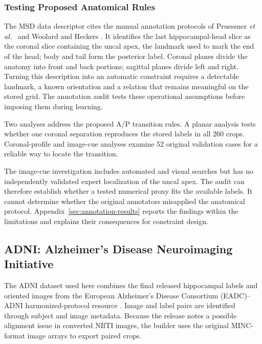 \subsubsection{Testing Proposed Anatomical Rules}
\label{sec:annotation-compatibility}

The MSD data descriptor \cite{simpson2019dataset} cites the manual
annotation protocols of Pruessner \emph{et al.}\
\cite{pruessner2000volumetry} and Woolard and Heckers
\cite{woolard2012asymmetry}. It identifies the last hippocampal-head slice
as the coronal slice containing the uncal apex, the landmark used to mark
the end of the head; body and tail form the posterior label. Coronal planes
divide the anatomy into front and back portions; sagittal planes divide left
and right. Turning this description into an automatic constraint requires a
detectable landmark, a known orientation and a relation that remains
meaningful on the stored grid. The annotation audit tests these operational
assumptions before imposing them during learning.

Two analyses address the proposed A/P transition rules. A planar analysis tests
whether one coronal separation reproduces the stored labels in all
260 crops. Coronal-profile and image-cue analyses examine 52 original
validation cases for a reliable way to locate the transition.

The image-cue investigation includes automated and visual searches but
has no independently validated expert localization of the uncal apex.
The audit can therefore establish whether a tested numerical proxy fits
the available labels. It cannot determine whether the original annotators
misapplied the anatomical protocol. Appendix~\ref{sec:annotation-results}
reports the findings within the limitations and explains their
consequences for constraint design.


\subsection{ADNI: Alzheimer's Disease Neuroimaging Initiative}
\label{sec:adni-methods}

The ADNI dataset used here combines the final released hippocampal labels
and oriented images from the European Alzheimer's Disease Consortium
(EADC)--ADNI harmonized-protocol resource \cite{harpReleasedLabels}. Image
and label pairs are identified through subject and image metadata. Because
the release notes a possible alignment issue in converted NIfTI images, the
builder uses the original MINC-format image arrays to export paired crops.

